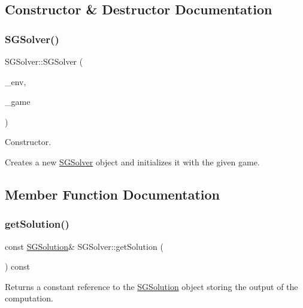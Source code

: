 \subsection{Constructor \& Destructor Documentation}
\mbox{\label{classSGSolver_afb38b33644c2768446f3a247f02dd643}} 
\subsubsection{\texorpdfstring{S\+G\+Solver()}{SGSolver()}}
{\footnotesize\ttfamily S\+G\+Solver\+::\+S\+G\+Solver (\begin{DoxyParamCaption}\item[{const \hyperlink{classSGEnv}{S\+G\+Env} \&}]{\+\_\+env,  }\item[{const \hyperlink{classSGGame}{S\+G\+Game} \&}]{\+\_\+game }\end{DoxyParamCaption})}



Constructor. 

Creates a new \hyperlink{classSGSolver}{S\+G\+Solver} object and initializes it with the given game. 

\subsection{Member Function Documentation}
\mbox{\label{classSGSolver_aeab5f94c8cc185aa08678ec4f1f859d4}} 
\subsubsection{\texorpdfstring{get\+Solution()}{getSolution()}}
{\footnotesize\ttfamily const \hyperlink{classSGSolution}{S\+G\+Solution}\& S\+G\+Solver\+::get\+Solution (\begin{DoxyParamCaption}{ }\end{DoxyParamCaption}) const\hspace{0.3cm}{\ttfamily [inline]}}

Returns a constant reference to the \hyperlink{classSGSolution}{S\+G\+Solution} object storing the output of the computation. \mbox{\label{classSGSolver_a220dd431eabdd9ff8419fafb28b7b990}} 
